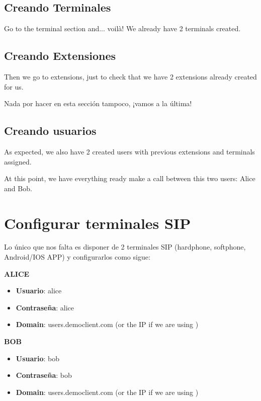 \documentclass[letterpaper,10pt,spanish]{sphinxmanual}
\begin{document}
\subsection{Creando Terminales}
\label{getting_started/internal_calls/client_portal:creating-terminals}
Go to the terminal section and... voilà! We already have 2 terminals created.


\subsection{Creando Extensiones}
\label{getting_started/internal_calls/client_portal:creating-extensions}
Then we go to extensions, just to check that we have 2 extensions already
created for us.

Nada por hacer en esta sección tampoco, ¡vamos a la última!


\subsection{Creando usuarios}
\label{getting_started/internal_calls/client_portal:creating-users}
As expected, we also have 2 created users with previous extensions and terminals assigned.

At this point, we have everything ready make a call between this two users: Alice and Bob.


\section{Configurar terminales SIP}
\label{getting_started/internal_calls/configure_sipuacs:sip-terminal-configuration}\label{getting_started/internal_calls/configure_sipuacs::doc}
Lo único que nos falta es disponer de 2 terminales SIP (hardphone, softphone, Android/IOS APP) y configurarlos como sigue:

\textbf{ALICE}
\begin{itemize}
\item {} 
\textbf{Usuario}: alice

\item {} 
\textbf{Contraseña}: alice

\item {} 
\textbf{Domain}: users.democlient.com (or the IP if we are using {\hyperref[getting_started/internal_calls/brand_portal:dnshack]{}})

\end{itemize}

\textbf{BOB}
\begin{itemize}
\item {} 
\textbf{Usuario}: bob

\item {} 
\textbf{Contraseña}: bob

\item {} 
\textbf{Domain}: users.democlient.com (or the IP if we are using {\hyperref[getting_started/internal_calls/brand_portal:dnshack]{}})

\end{itemize}
\end{document}
